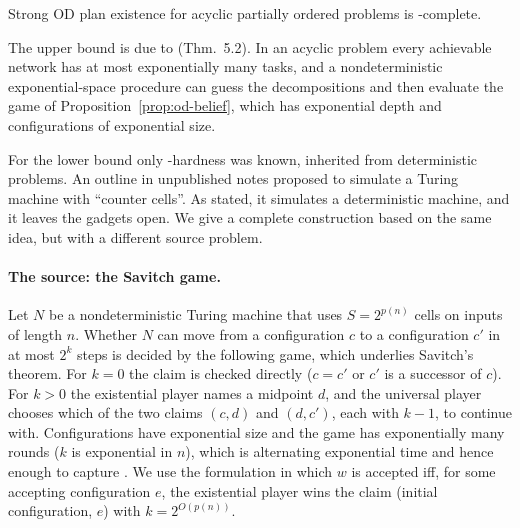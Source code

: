 \begin{theorem}\label{thm:acyc-od}
  Strong OD plan existence for acyclic partially ordered problems is \EXPSPACE-complete.
\end{theorem}

The upper bound is due to \CBa{} (Thm.~5.2). In an acyclic problem every achievable network has
at most exponentially many tasks, and a nondeterministic exponential-space procedure can guess
the decompositions and then evaluate the game of Proposition~\ref{prop:od-belief}, which has
exponential depth and configurations of exponential size.

For the lower bound only \NEXPTIME-hardness was known, inherited from deterministic problems. An
outline in unpublished notes proposed to simulate a Turing machine with ``counter cells''. As
stated, it simulates a deterministic machine, and it leaves the gadgets open. We give a complete
construction based on the same idea, but with a different source problem.

\paragraph{The source: the Savitch game.}
Let $N$ be a nondeterministic Turing machine that uses $S=2^{p(n)}$ cells on inputs of length $n$.
Whether $N$ can move from a configuration $c$ to a configuration $c'$ in at most $2^k$ steps is
decided by the following game, which underlies Savitch's theorem. For $k=0$ the claim is checked
directly ($c=c'$ or $c'$ is a successor of $c$). For $k>0$ the existential player names a
midpoint $d$, and the universal player chooses which of the two claims $(c,d)$ and $(d,c')$, each
with $k-1$, to continue with. Configurations have exponential size and the game has exponentially
many rounds ($k$ is exponential in $n$), which is alternating exponential time and hence enough to
capture \EXPSPACE{} \parencite{chandra:et:al:jacm-81}. We use the formulation in which $w$ is
accepted iff, for some accepting configuration $e$, the existential player wins the claim
(initial configuration, $e$) with $k=2^{O(p(n))}$.


